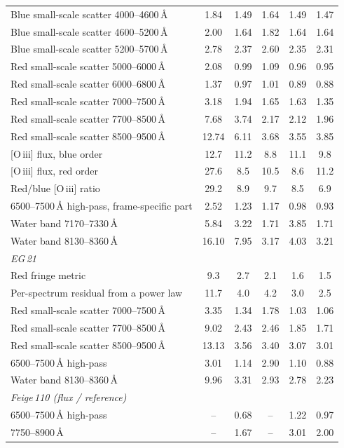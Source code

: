 \begin{table}[!htbp]
\begin{tabular}{lccccc}
Blue small-scale scatter 4000--4600\,\AA & 1.84 & 1.49 & 1.64 & 1.49 & 1.47 \\
Blue small-scale scatter 4600--5200\,\AA & 2.00 & 1.64 & 1.82 & 1.64 & 1.64 \\
Blue small-scale scatter 5200--5700\,\AA & 2.78 & 2.37 & 2.60 & 2.35 & 2.31 \\
Red small-scale scatter 5000--6000\,\AA & 2.08 & 0.99 & 1.09 & 0.96 & 0.95 \\
Red small-scale scatter 6000--6800\,\AA & 1.37 & 0.97 & 1.01 & 0.89 & 0.88 \\
Red small-scale scatter 7000--7500\,\AA & 3.18 & 1.94 & 1.65 & 1.63 & 1.35 \\
Red small-scale scatter 7700--8500\,\AA & 7.68 & 3.74 & 2.17 & 2.12 & 1.96 \\
Red small-scale scatter 8500--9500\,\AA & 12.74 & 6.11 & 3.68 & 3.55 & 3.85 \\
{[O\,{\sc iii}]} flux, blue order & 12.7 & 11.2 & 8.8 & 11.1 & 9.8 \\
{[O\,{\sc iii}]} flux, red order & 27.6 & 8.5 & 10.5 & 8.6 & 11.2 \\
Red/blue {[O\,{\sc iii}]} ratio & 29.2 & 8.9 & 9.7 & 8.5 & 6.9 \\
6500--7500\,\AA{} high-pass, frame-specific part & 2.52 & 1.23 & 1.17 & 0.98 & 0.93 \\
Water band 7170--7330\,\AA & 5.84 & 3.22 & 1.71 & 3.85 & 1.71 \\
Water band 8130--8360\,\AA & 16.10 & 7.95 & 3.17 & 4.03 & 3.21 \\
\midrule
\multicolumn{6}{l}{\textit{EG\,21}}\\
Red fringe metric & 9.3 & 2.7 & 2.1 & 1.6 & 1.5 \\
Per-spectrum residual from a power law & 11.7 & 4.0 & 4.2 & 3.0 & 2.5 \\
Red small-scale scatter 7000--7500\,\AA & 3.35 & 1.34 & 1.78 & 1.03 & 1.06 \\
Red small-scale scatter 7700--8500\,\AA & 9.02 & 2.43 & 2.46 & 1.85 & 1.71 \\
Red small-scale scatter 8500--9500\,\AA & 13.13 & 3.56 & 3.40 & 3.07 & 3.01 \\
6500--7500\,\AA{} high-pass & 3.01 & 1.14 & 2.90 & 1.10 & 0.88 \\
Water band 8130--8360\,\AA & 9.96 & 3.31 & 2.93 & 2.78 & 2.23 \\
\midrule
\multicolumn{6}{l}{\textit{Feige\,110 (flux / reference)}}\\
6500--7500\,\AA{} high-pass & -- & 0.68 & -- & 1.22 & 0.97 \\
7750--8900\,\AA & -- & 1.67 & -- & 3.01 & 2.00 \\
\bottomrule
\end{tabular}
\end{table}

